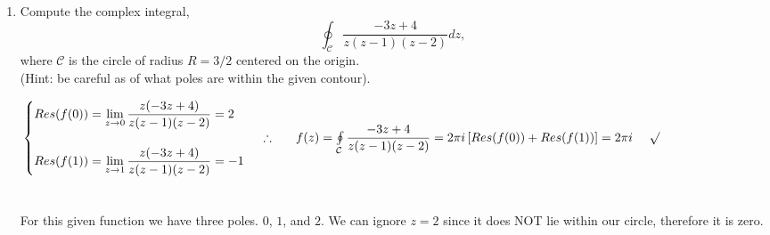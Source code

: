 \documentclass[fleqn]{article}
\begin{document}
\begin{enumerate}
    
    \item Compute the complex integral,
    $$ \oint_{\mathcal C} \frac{-3z + 4}{z(z-1)(z-2)} dz ,$$
    where ${\mathcal C}$ is the circle of radius $R=3/2$ centered on the origin. \\
    (Hint:  be careful as of what poles are within the given contour). 

      \textcolor{hwColor}{
        $
        \\
        \\
          \begin{cases}
            Res(f(0))=\lim\limits_{z \to 0} \dfrac{z(-3z+4)}{z(z-1)(z-2)}=2
            \\
            \\
            Res(f(1))=\lim\limits_{z \to 1} \dfrac{z(-3z+4)}{z(z-1)(z-2)}=-1
          \end{cases}
          \\
          \\
          \\
          \therefore ~~~~~ f(z)=\oint\limits_{\mathcal{C}} \dfrac{-3z+4}{z(z-1)(z-2)}=2\pi i \left[Res(f(0))+Res(f(1))\right]=2 \pi i ~~~~ \surd
        $
        \\
        \\
        \\
        For this given function we have three poles. $0$, $1$, and $2$. We can ignore $z=2$ since it does NOT lie
        within our circle, therefore it is zero.  
      }
    
  \end{enumerate}
\end{document}
